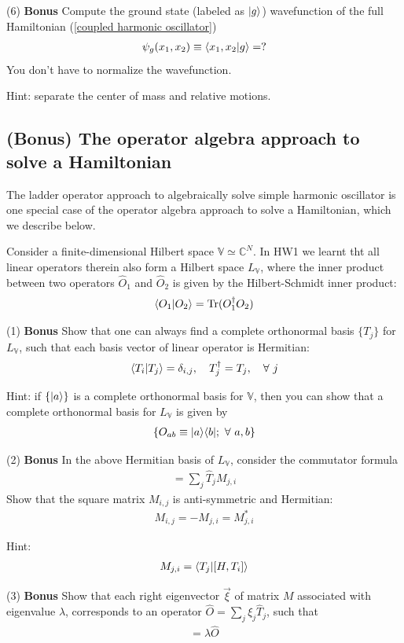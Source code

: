 (6) \textbf{Bonus} Compute the ground state (labeled as $|{g}\rangle$) wavefunction of the full Hamiltonian (\ref{coupled harmonic oscillator})
\begin{align}
\psi_g(x_1,x_2)\equiv\langle{x_1,x_2|g}\rangle=?
\end{align}
You don't have to normalize the wavefunction. 

Hint: separate the center of mass and relative motions. 

\subsection{(Bonus) The operator algebra approach to solve a Hamiltonian}

The ladder operator approach to algebraically solve simple harmonic oscillator is one special case of the operator algebra approach to solve a Hamiltonian, which we describe below. 

Consider a finite-dimensional Hilbert space $\mathbb{V}\simeq\mathbb{C}^N$. In HW1 we learnt tht all linear operators therein also form a Hilbert space $L_\mathbb{V}$, where the inner product between two operators $\hat O_1$ and $\hat O_2$ is given by the Hilbert-Schmidt inner product:
\begin{align}
\langle{O_1|O_2}\rangle=\operatorname{Tr}(O_1^\dagger O_2)
\end{align}

(1) \textbf{Bonus} Show that one can always find a complete orthonormal basis $\{T_j\}$ for $L_\mathbb{V}$, such that each basis vector of linear operator is Hermitian:
\begin{align}
\langle{T_i|T_j}\rangle=\delta_{i,j},~~~T_j^\dagger=T_j,~~~\forall~j
\end{align}

Hint: if $\{|{a}\rangle\}$ is a complete orthonormal basis for $\mathbb{V}$, then you can show that a complete orthonormal basis for $L_\mathbb{V}$ is 
given by
\begin{align}
\{O_{ab}\equiv|{a}\rangle\langle{b}|;~\forall~a,b\}
\end{align}

(2) \textbf{Bonus} In the above Hermitian basis of $L_\mathbb{V}$, consider the commutator formula
\begin{align}
[\hat H,\hat T_i]=\sum_j\hat T_jM_{j,i}
\end{align}
Show that the square matrix $M_{i,j}$ is anti-symmetric and Hermitian:
\begin{align}
M_{i,j}=-M_{j,i}=M^\ast_{j,i}
\end{align}

Hint: 
\begin{align}
M_{j,i}=\langle{T_j|[H,T_i]}\rangle
\end{align}

(3) \textbf{Bonus} Show that each right eigenvector $\vec\xi$ of matrix $M$ associated with eigenvalue $\lambda$, corresponds to an operator $\hat O=\sum_j\xi_j\hat T_j$, such that
\begin{align}
[\hat H,\hat O]=\lambda\hat O
\end{align}